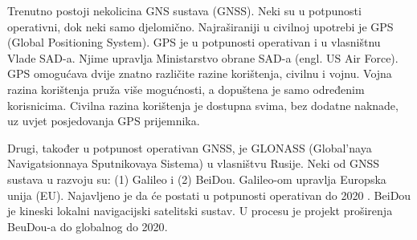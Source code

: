 \documentclass[a4paper,twoside,12pt]{memoir} %
\begin{document}
\begin{intro}
\begin{figure}[H]
	\end{figure}
	
	Trenutno postoji nekolicina GNS sustava (GNSS). Neki su u potpunosti 
	operativni, dok neki samo djelomično.
	Najraširaniji u civilnoj upotrebi je GPS (Global Positioning System).
	GPS je u potpunosti operativan i u vlasništnu Vlade SAD-a. Njime upravlja Ministarstvo obrane SAD-a (engl. US Air Force).
	GPS omogućava dvije znatno različite razine korištenja, civilnu i vojnu.
	Vojna razina korištenja pruža više mogućnosti, a dopuštena je samo određenim 
	korisnicima. Civilna razina korištenja je dostupna svima, bez dodatne naknade, uz uvjet posjedovanja GPS prijemnika. 
	
	Drugi, također u potpunost operativan GNSS, je GLONASS (Global'naya Navigatsionnaya Sputnikovaya Sistema) u vlasništvu Rusije.
	Neki od GNSS sustava u razvoju su: (1) Galileo i (2) BeiDou.
	Galileo-om upravlja Europska unija (EU). Najavljeno je da će postati u potpunosti operativan do 2020 \cite{bookProcessing}.
	BeiDou je kineski lokalni navigacijski satelitski sustav. U procesu je projekt proširenja BeuDou-a do globalnog do 2020\cite{bookProcessing}.
	

\end{intro}
\end{document}
